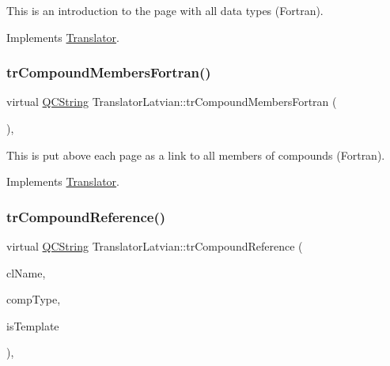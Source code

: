 This is an introduction to the page with all data types (Fortran). 

Implements \mbox{\hyperlink{class_translator}{Translator}}.

\mbox{\label{class_translator_latvian_acaaf3d78109d12e2dfb897b8939d53d1}} 
\subsubsection{\texorpdfstring{trCompoundMembersFortran()}{trCompoundMembersFortran()}}
{\footnotesize\ttfamily virtual \mbox{\hyperlink{class_q_c_string}{Q\+C\+String}} Translator\+Latvian\+::tr\+Compound\+Members\+Fortran (\begin{DoxyParamCaption}{ }\end{DoxyParamCaption})\hspace{0.3cm}{\ttfamily [inline]}, {\ttfamily [virtual]}}

This is put above each page as a link to all members of compounds (Fortran). 

Implements \mbox{\hyperlink{class_translator}{Translator}}.

\mbox{\label{class_translator_latvian_a33751cd91b98a69cfa94a78e78f213e3}} 
\subsubsection{\texorpdfstring{trCompoundReference()}{trCompoundReference()}}
{\footnotesize\ttfamily virtual \mbox{\hyperlink{class_q_c_string}{Q\+C\+String}} Translator\+Latvian\+::tr\+Compound\+Reference (\begin{DoxyParamCaption}\item[{const char $\ast$}]{cl\+Name,  }\item[{\mbox{\hyperlink{class_class_def_ae70cf86d35fe954a94c566fbcfc87939}{Class\+Def\+::\+Compound\+Type}}}]{comp\+Type,  }\item[{bool}]{is\+Template }\end{DoxyParamCaption})\hspace{0.3cm}{\ttfamily [inline]}, {\ttfamily [virtual]}}


